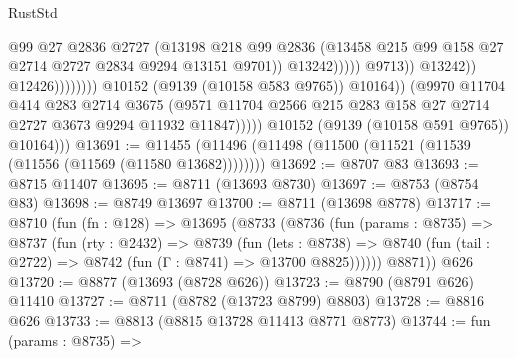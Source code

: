 \begin{lexlean}{RustStd}
\begin{coremodule}
                                                      @99
                                                      @27
                                                      @2836
                                                      @2727
                                                      (@13198
                                                        @218
                                                        @99
                                                        @2836
                                                        (@13458
                                                          @215
                                                          @99
                                                          @158
                                                          @27
                                                          @2714
                                                          @2727
                                                          @2834
                                                          @9294
                                                          @13151
                                                          @9701))
                                                      @13242)))))
                                            @9713))
                                        @13242))
                                    @12426))))))))
                    @10152
                    (@9139 (@10158 @583 @9765))
                    @10164))
                (@9970
                  @11704
                  @414
                  @283
                  @2714
                  @3675
                  (@9571 @11704 @2566 @215 @283 @158 @27 @2714 @2727 @3673 @9294 @11932 @11847)))))
          @10152
          (@9139 (@10158 @591 @9765))
          @10164)))
@13691 := @11455 (@11496 (@11498 (@11500 (@11521 (@11539 (@11556 (@11569 (@11580 @13682))))))))
@13692 := @8707 @83
@13693 := @8715 @11407
@13695 := @8711 (@13693 @8730)
@13697 := @8753 (@8754 @83)
@13698 := @8749 @13697
@13700 := @8711 (@13698 @8778)
@13717 := @8710
    (fun (fn : @128) =>
    @13695
      (@8733
        (@8736
          (fun (params : @8735) =>
          @8737
            (fun (rty : @2432) =>
            @8739
              (fun (lets : @8738) =>
              @8740 (fun (tail : @2722) => @8742 (fun (Γ : @8741) => @13700 @8825))))))
        @8871))
    @626
@13720 := @8877 (@13693 (@8728 @626))
@13723 := @8790 (@8791 @626) @11410
@13727 := @8711 (@8782 (@13723 @8799) @8803)
@13728 := @8816 @626
@13733 := @8813 (@8815 @13728 @11413 @8771 @8773)
@13744 := fun (params : @8735) =>

\end{coremodule}
\end{lexlean}
